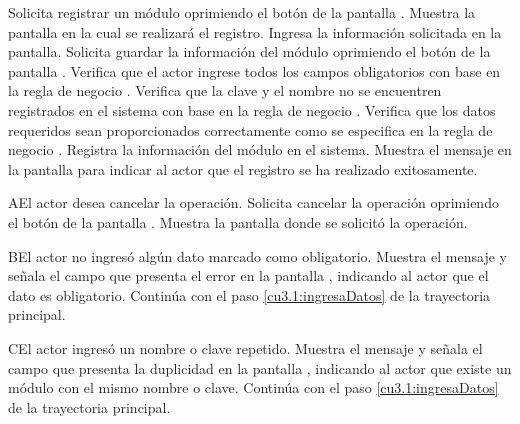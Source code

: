  \begin{UCtrayectoria}
    \UCpaso[\UCactor] Solicita registrar un módulo oprimiendo el botón  de la pantalla .
    \UCpaso[\UCsist] Muestra la pantalla  en la cual se realizará el registro. 
    \UCpaso[\UCactor] Ingresa la información solicitada en la pantalla. \label{cu3.1:ingresaDatos}
    \UCpaso[\UCactor] Solicita guardar la información del módulo oprimiendo el botón  de la pantalla .  
    \UCpaso[\UCsist] Verifica que el actor ingrese todos los campos obligatorios con base en la regla de negocio . 
    \UCpaso[\UCsist] Verifica que la clave y el nombre no se encuentren registrados en el sistema con base en la regla de negocio  . 
    \UCpaso[\UCsist] Verifica que los datos requeridos sean proporcionados correctamente como se especifica en la regla de negocio .  
    \UCpaso[\UCsist] Registra la información del módulo en el sistema.
    \UCpaso[\UCsist] Muestra el mensaje  en la pantalla 
    para indicar al actor que el registro se ha realizado exitosamente.
 \end{UCtrayectoria}
 \begin{UCtrayectoriaA}{A}{El actor desea cancelar la operación.}
    \UCpaso[\UCactor] Solicita cancelar la operación oprimiendo el botón  de la pantalla .
    \UCpaso[\UCsist] Muestra la pantalla donde se solicitó la operación.
 \end{UCtrayectoriaA} 
 \begin{UCtrayectoriaA}{B}{El actor no ingresó algún dato marcado como obligatorio.}
    \UCpaso[\UCsist] Muestra el mensaje  y señala el campo que presenta el error en la pantalla 
	    , indicando al actor que el dato es obligatorio.
    \UCpaso[] Continúa con el paso \ref{cu3.1:ingresaDatos} de la trayectoria principal.
 \end{UCtrayectoriaA}
 \begin{UCtrayectoriaA}{C}{El actor ingresó un nombre o clave repetido.}
    \UCpaso[\UCsist] Muestra el mensaje  y señala el campo que presenta la duplicidad en la pantalla 
	    , indicando al actor que existe un módulo con el mismo nombre o clave.
    \UCpaso[] Continúa con el paso \ref{cu3.1:ingresaDatos} de la trayectoria principal.
 \end{UCtrayectoriaA}
 
